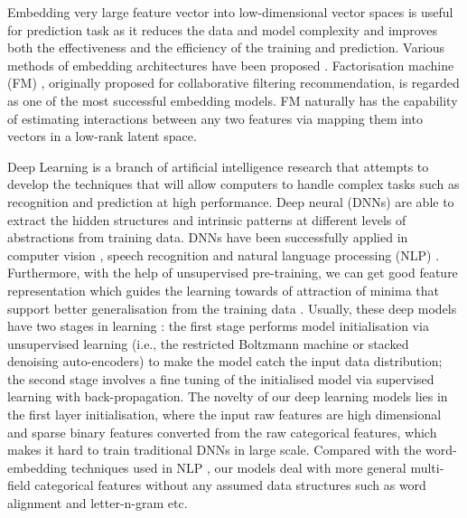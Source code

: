 \documentclass{llncs}
\begin{document}
Embedding very large feature vector into low-dimensional vector spaces is useful for prediction task as it reduces the data and model complexity and improves both the effectiveness and the efficiency of the training and prediction. Various methods of embedding architectures have been proposed \cite{tang2015line,kurashima2014probabilistic}.
Factorisation machine (FM) \cite{rendle2012factorization}, originally proposed for collaborative filtering recommendation, is regarded as one of the most successful embedding models. FM naturally has the capability of estimating interactions between any two features via mapping them into vectors in a low-rank latent space.


Deep Learning \cite{bengio2009learning} is a branch of artificial intelligence research that attempts to develop the techniques that will allow computers to handle complex tasks such as recognition and prediction at high performance. Deep neural  (DNNs) are able to extract the hidden structures and intrinsic patterns at different levels of abstractions from training data. DNNs have been successfully applied in computer vision \cite{zeiler2011adaptive}, speech recognition \cite{deng2013deep} and natural language processing (NLP) \cite{collobert2011natural,huang2013learning,shen2014latent}. Furthermore, with the help of unsupervised pre-training, we can get good feature representation which guides the learning towards  of attraction of minima that support better generalisation from the training data \cite{erhan2010does}. Usually, these deep models have two stages in learning \cite{hinton2006reducing}: the first stage performs model initialisation via unsupervised learning (i.e., the restricted Boltzmann machine or stacked denoising auto-encoders) to make the model catch the input data distribution; the second stage involves a fine tuning of the initialised model via supervised learning with back-propagation. The novelty of our deep learning models lies in the first layer initialisation, where the input raw features are high dimensional and sparse binary features converted from the raw categorical features, which makes it hard to train traditional DNNs in large scale. Compared with the word-embedding techniques used in NLP \cite{huang2013learning,shen2014latent}, our models deal with more general multi-field categorical features without any assumed data structures such as word alignment and letter-n-gram etc.
\end{document}

